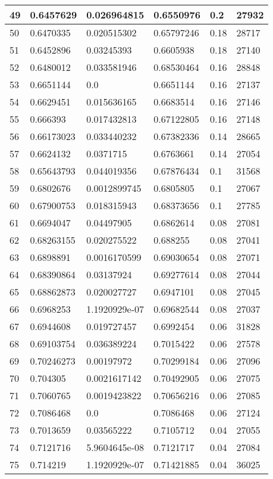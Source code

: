 \begin{longtable}{|l|l|l|l|l|l|}
49 & 0.6457629 & 0.026964815 & 0.6550976 & 0.2 & 27932 \\ \hline 
50 & 0.6470335 & 0.020515302 & 0.65797246 & 0.18 & 28717 \\ \hline 
51 & 0.6452896 & 0.03245393 & 0.6605938 & 0.18 & 27140 \\ \hline 
52 & 0.6480012 & 0.033581946 & 0.68530464 & 0.16 & 28848 \\ \hline 
53 & 0.6651144 & 0.0 & 0.6651144 & 0.16 & 27137 \\ \hline 
54 & 0.6629451 & 0.015636165 & 0.6683514 & 0.16 & 27146 \\ \hline 
55 & 0.666393 & 0.017432813 & 0.67122805 & 0.16 & 27148 \\ \hline 
56 & 0.66173023 & 0.033440232 & 0.67382336 & 0.14 & 28665 \\ \hline 
57 & 0.6624132 & 0.0371715 & 0.6763661 & 0.14 & 27054 \\ \hline 
58 & 0.65643793 & 0.044019356 & 0.67876434 & 0.1 & 31568 \\ \hline 
59 & 0.6802676 & 0.0012899745 & 0.6805805 & 0.1 & 27067 \\ \hline 
60 & 0.67900753 & 0.018315943 & 0.68373656 & 0.1 & 27785 \\ \hline 
61 & 0.6694047 & 0.04497905 & 0.6862614 & 0.08 & 27081 \\ \hline 
62 & 0.68263155 & 0.020275522 & 0.688255 & 0.08 & 27041 \\ \hline 
63 & 0.6898891 & 0.0016170599 & 0.69030654 & 0.08 & 27071 \\ \hline 
64 & 0.68390864 & 0.03137924 & 0.69277614 & 0.08 & 27044 \\ \hline 
65 & 0.68862873 & 0.020027727 & 0.6947101 & 0.08 & 27045 \\ \hline 
66 & 0.6968253 & 1.1920929e-07 & 0.69682544 & 0.08 & 27037 \\ \hline 
67 & 0.6944608 & 0.019727457 & 0.6992454 & 0.06 & 31828 \\ \hline 
68 & 0.69103754 & 0.036389224 & 0.7015422 & 0.06 & 27578 \\ \hline 
69 & 0.70246273 & 0.00197972 & 0.70299184 & 0.06 & 27096 \\ \hline 
70 & 0.704305 & 0.0021617142 & 0.70492905 & 0.06 & 27075 \\ \hline 
71 & 0.7060765 & 0.0019423822 & 0.70656216 & 0.06 & 27085 \\ \hline 
72 & 0.7086468 & 0.0 & 0.7086468 & 0.06 & 27124 \\ \hline 
73 & 0.7013659 & 0.03565222 & 0.7105712 & 0.04 & 27055 \\ \hline 
74 & 0.7121716 & 5.9604645e-08 & 0.7121717 & 0.04 & 27084 \\ \hline 
75 & 0.714219 & 1.1920929e-07 & 0.71421885 & 0.04 & 36025 \\ \hline 
\end{longtable}